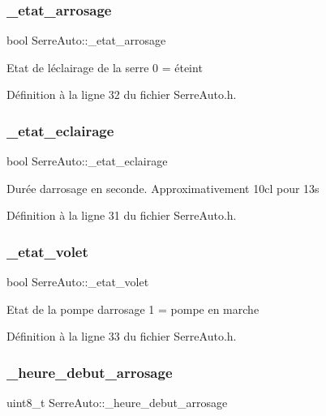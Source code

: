 \subsubsection{\+\_\+etat\+\_\+arrosage}
{\footnotesize\ttfamily bool Serre\+Auto\+::\+\_\+etat\+\_\+arrosage\hspace{0.3cm}{\ttfamily [private]}}

Etat de l\textquotesingle{}éclairage de la serre 0 = éteint 

Définition à la ligne 32 du fichier Serre\+Auto.\+h.

\mbox{\label{class_serre_auto_a024c1816510888bfb2a8112aa75ce3fd}} 
\subsubsection{\+\_\+etat\+\_\+eclairage}
{\footnotesize\ttfamily bool Serre\+Auto\+::\+\_\+etat\+\_\+eclairage\hspace{0.3cm}{\ttfamily [private]}}

Durée d\textquotesingle{}arrosage en seconde. Approximativement 10cl pour 13s 

Définition à la ligne 31 du fichier Serre\+Auto.\+h.

\mbox{\label{class_serre_auto_aac35214361a529386f65eaf33ad6e11c}} 
\subsubsection{\+\_\+etat\+\_\+volet}
{\footnotesize\ttfamily bool Serre\+Auto\+::\+\_\+etat\+\_\+volet\hspace{0.3cm}{\ttfamily [private]}}

Etat de la pompe d\textquotesingle{}arrosage 1 = pompe en marche 

Définition à la ligne 33 du fichier Serre\+Auto.\+h.

\mbox{\label{class_serre_auto_a0301175d17be15fd28e1fd24948df564}} 
\subsubsection{\+\_\+heure\+\_\+debut\+\_\+arrosage}
{\footnotesize\ttfamily uint8\+\_\+t Serre\+Auto\+::\+\_\+heure\+\_\+debut\+\_\+arrosage\hspace{0.3cm}{\ttfamily [private]}}

